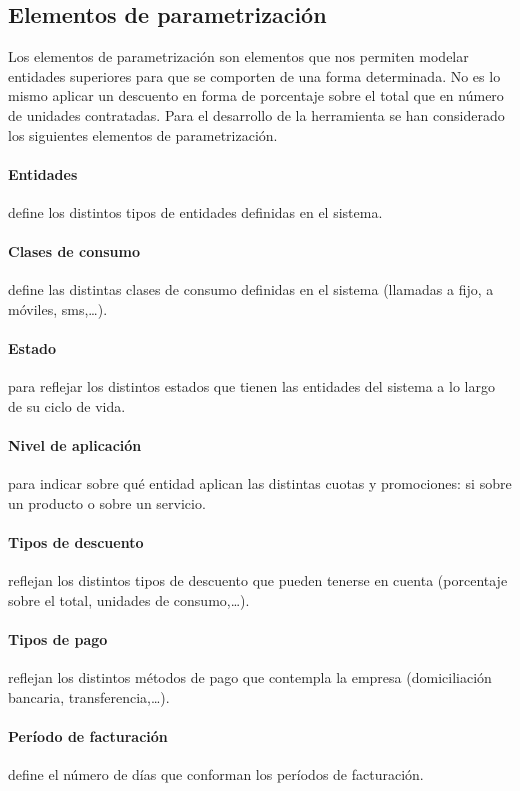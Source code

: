 \subsection{Elementos de parametrización}
\label{sub:parametrizacion}
Los elementos de parametrización son elementos que nos permiten modelar entidades superiores para que se comporten de una forma determinada. No es lo mismo aplicar un descuento en forma de porcentaje sobre el total que en número de unidades contratadas. Para el desarrollo de la herramienta se han considerado los siguientes elementos de parametrización.

\paragraph{Entidades} define los distintos tipos de entidades definidas en el sistema.
\paragraph{Clases de consumo} define las distintas clases de consumo definidas en el sistema (llamadas a fijo, a móviles, sms,\dots).
\paragraph{Estado} para reflejar los distintos estados que tienen las entidades del sistema a lo largo de su ciclo de vida.
\paragraph{Nivel de aplicación} para indicar sobre qué entidad aplican las distintas cuotas y promociones: si sobre un producto o sobre un servicio.
\paragraph{Tipos de descuento} reflejan los distintos tipos de descuento que pueden tenerse en cuenta (porcentaje sobre el total, unidades de consumo,\dots).
\paragraph{Tipos de pago} reflejan los distintos métodos de pago que contempla la empresa (domiciliación bancaria, transferencia,\dots).
\paragraph{Período de facturación} define el número de días que conforman los  períodos de facturación.
